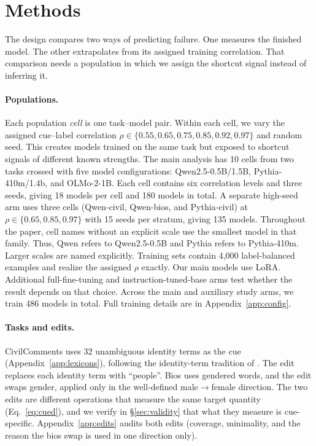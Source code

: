 \documentclass[11pt]{article}
\begin{document}
\section{Methods}
\label{sec:design}

The design compares two ways of predicting failure. One measures the finished model. The other extrapolates from its assigned training correlation. That comparison
needs a population in which we assign the shortcut signal instead of inferring
it.

\paragraph{Populations.}
Each population \emph{cell} is one task--model pair. Within each cell, we vary
the assigned cue--label correlation
$\rho \in \{0.55,\allowbreak 0.65,\allowbreak 0.75,\allowbreak 0.85,\allowbreak 0.92,\allowbreak 0.97\}$ and random seed. This creates
models trained on the same task but exposed to shortcut signals of different
known strengths. The main analysis has 10 cells from two tasks crossed with five model
configurations: Qwen2.5-0.5B/1.5B, Pythia-410m/1.4b, and OLMo-2-1B.
Each cell contains six correlation levels and three seeds, giving 18 models per
cell and 180 models in total. A separate high-seed arm uses three cells
(Qwen-civil, Qwen-bios, and Pythia-civil) at
$\rho \in \{0.65,0.85,0.97\}$ with 15 seeds per stratum, giving 135 models. Throughout the paper, cell names without an explicit scale use the smallest
model in that family. Thus, Qwen refers to Qwen2.5-0.5B and Pythia refers to
Pythia-410m. Larger scales are named explicitly. Training sets contain 4{,}000 label-balanced examples and
realize the assigned $\rho$ exactly. Our main models use LoRA. Additional
full-fine-tuning and instruction-tuned-base arms test whether the result depends
on that choice. Across the main and auxiliary study arms, we train 486 models
in total. Full training details are in Appendix~\ref{app:config}.

\paragraph{Tasks and edits.}
CivilComments uses 32 unambiguous identity terms as the cue (Appendix~\ref{app:lexicons}), following the identity-term tradition of \citet{dixon2018measuring}. The edit replaces each identity term with ``people''. Bios uses gendered words, and the
edit swaps gender, applied only in the well-defined male$\rightarrow$female
direction. The two edits are different operations that measure the same target quantity
(Eq.~\ref{eq:cued}), and we verify in \S\ref{sec:validity} that what they
measure is cue-specific. Appendix~\ref{app:edits} audits both edits (coverage,
minimality, and the reason the bios swap is used in one direction only).
\end{document}
